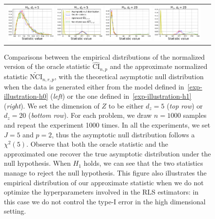 \begin{figure}[ht]
\begin{tabular}{cc} 
\includegraphics[width=0.24\textwidth]{sections/appendix/independence_testing_kernel/new_figures_oracle/oracle_h0_dim_5.pdf} \includegraphics[width=0.24\textwidth]{sections/appendix/independence_testing_kernel/new_figures_oracle/oracle_h1_dim_5.pdf}  
\includegraphics[width=0.24\textwidth]{sections/appendix/independence_testing_kernel/new_figures_oracle/oracle_h0_dim_20.pdf} \includegraphics[width=0.24\textwidth]{sections/appendix/independence_testing_kernel/new_figures_oracle/oracle_h1_dim_20.pdf}
\end{tabular} 
\caption{Comparisons between the empirical distributions of the normalized version of the oracle statistic  $\widehat{\text{CI}}_{n,p}$ and the approximate normalized statistic $\widetilde{\text{NCI}}_{n,r,p}$, with the theoretical asymptotic null distribution when the data is generated either from the model defined in~\eqref{exp-illustration-h0} (\emph{left}) or the one defined in~\eqref{exp-illustration-h1} (\emph{right}). We set the dimension of $Z$ to be either $d_z=5$ (\emph{top row}) or $d_z=20$ (\emph{bottom row}). For each problem, we draw $n=1000$ samples and repeat the experiment 1000 times. In all the experiments, we set $J=5$ and $p=2$, thus the asymptotic null distribution follows a $\chi^2(5)$. Observe that both the oracle statistic and the approximated one recover the true asymptotic distribution under the null hypothesis. When $H_1$ holds, we can see that the two statistics manage to reject the null hypothesis. This figure also illustrates the empirical distribution of our approximate statistic when we do not optimize the hyperparameters involved in the RLS estimators: in this case we do not control the type-I error in the high dimensional setting.\label{fig-illustation-theory}}
\vspace{-0.4cm}
\end{figure}



